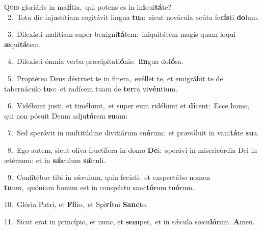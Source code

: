 \lettrine{\initial\textcolor{\initialcolor}{Q}}{uid} gloriáris in ma\-\textbf{lí}\-tia,~\star qui potens es in in\-\textbf{i}\-qui\-\textbf{tá}\-te?\\
{\numbfont\textcolor{\numbcolor}{~2.}}~Tota die injustítiam cogitávit lingua \textbf{tu}\-a:~\star sicut novácula acúta fe\-\textbf{cís}\-ti \textbf{do}\-lum.\par
{\numbfont\textcolor{\numbcolor}{~3.}}~Dilexísti malítiam super benigni\-\textbf{tá}\-tem:~\star iniquitátem magis quam loqui \textbf{æ}\-qui\-\textbf{tá}\-tem.\par
{\numbfont\textcolor{\numbcolor}{~4.}}~Dilexísti ómnia verba præcipitati\-\textbf{ó}\-nis:~\star \textbf{lin}\-gua do\-\textbf{ló}\-sa.\par
{\numbfont\textcolor{\numbcolor}{~5.}}~Proptérea Deus déstruet te in finem,~\dagger evéllet te, et emigrábit te de tabernáculo \textbf{tu}\-o:~\star et radícem tuam de \textbf{ter}\-ra vi\-\textbf{vén}\-tium.\par
{\numbfont\textcolor{\numbcolor}{~6.}}~Vidébunt justi, et timébunt,~\dagger et super eum ridébunt et \textbf{di}\-cent:~\star Ecce homo, qui non pósuit Deum adju\-\textbf{tó}\-rem \textbf{su}\-um:\par
{\numbfont\textcolor{\numbcolor}{~7.}}~Sed sperávit in multitúdine divitiárum su\-\textbf{á}\-rum:~\star et præváluit in vani\-\textbf{tá}\-te \textbf{su}\-a.\par
{\numbfont\textcolor{\numbcolor}{~8.}}~Ego autem, sicut olíva fructífera in domo \textbf{De}\-i:~\star sperávi in misericórdia Dei in ætérnum: et in \textbf{sǽ}\-culum \textbf{sǽ}\-culi.\par
{\numbfont\textcolor{\numbcolor}{~9.}}~Confitébor tibi in sǽculum, quia fecísti:~\dagger et exspectábo nomen \textbf{tu}\-um,~\star quóniam bonum est in conspéctu sanc\-\textbf{tó}\-rum tu\-\textbf{ó}\-rum.\par
{\numbfont\textcolor{\numbcolor}{10.}}~Glória Patri, et \textbf{Fí}\-lio,~\star et Spi\-\textbf{rí}\-tui \textbf{Sanc}\-to.\par
{\numbfont\textcolor{\numbcolor}{11.}}~Sicut erat in princípio, et nunc, et \textbf{sem}\-per,~\star et in sǽcula sæcu\-\textbf{ló}\-rum. \textbf{A}\-men.\par
